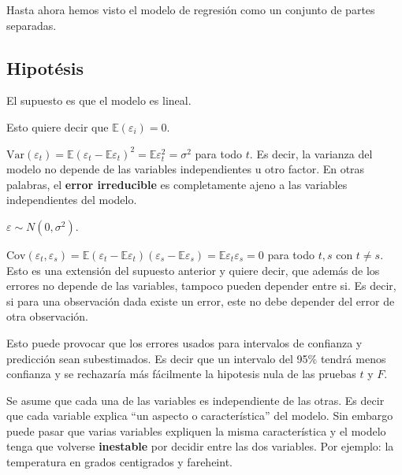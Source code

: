 \documentclass[
  12pt,
]{book}
\providecommand{\tightlist}{%
  \setlength{\itemsep}{0pt}\setlength{\parskip}{0pt}}
\theoremstyle{definition}
\theoremstyle{definition}
\theoremstyle{definition}
\theoremstyle{remark}
\begin{document}
Hasta ahora hemos visto el modelo de regresión como un conjunto de partes separadas.

\hypertarget{hipotuxe9sis}{%
\subsection{Hipotésis}\label{hipotuxe9sis}}

\begin{description}
\tightlist
\item[Independencia lineal]
El supuesto es que el modelo es lineal.
\item[Errores con esperanza nula]
Esto quiere decir que \(\mathbb{E}(\varepsilon_i) = 0\).
\item[Homocedasticidad]
\(\text{Var}(\varepsilon_t) = \mathbb{E}(\varepsilon_t - \mathbb{E} \varepsilon_t)^2 = \mathbb{E} \varepsilon_t^2 = \sigma^2\) para todo \(t\). Es decir, la varianza del modelo no depende de las variables independientes u otro factor. En otras palabras, el \textbf{error irreducible} es completamente ajeno a las variables independientes del modelo.
\item[Normalidad de los residuos]
\(\varepsilon \sim N(0, \sigma^2 )\).
\item[Independencia de los erroes]
\(\text{Cov}(\varepsilon_t,\varepsilon_s ) = \mathbb{E} (\varepsilon_t - \mathbb{E} \varepsilon_t) (\varepsilon_s - \mathbb{E} \varepsilon_s) = \mathbb{E} \varepsilon_t \varepsilon_s = 0\) para todo \(t,s\) con \(t\neq s\). Esto es una extensión del supuesto anterior y quiere decir, que además de los errores no depende de las variables, tampoco pueden depender entre si. Es decir, si para una observación dada existe un error, este no debe depender del error de otra observación.
\end{description}

Esto puede provocar que los errores usados para intervalos de confianza y predicción sean subestimados. Es decir que un intervalo del 95\% tendrá menos confianza y se rechazaría más fácilmente la hipotesis nula de las pruebas \(t\) y \(F\).

\begin{description}
\tightlist
\item[Multicolineaidad]
Se asume que cada una de las variables es independiente de las otras. Es decir que cada variable explica ``un aspecto o característica'' del modelo. Sin embargo puede pasar que varias variables expliquen la misma característica y el modelo tenga que volverse \textbf{inestable} por decidir entre las dos variables. Por ejemplo: la temperatura en grados centigrados y fareheint.
\end{description}
\end{document}
